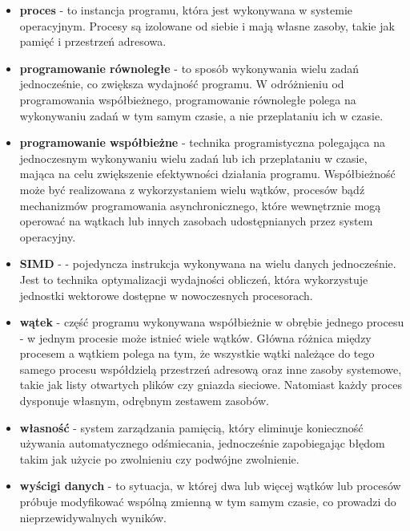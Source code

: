 \begin{itemize}
    \item \textbf{proces} - to instancja programu, która jest wykonywana w systemie operacyjnym. Procesy są izolowane od siebie i mają własne zasoby, takie jak pamięć i przestrzeń adresowa.

    \item \textbf{programowanie równoległe} - to sposób wykonywania wielu zadań jednocześnie, co zwiększa wydajność programu. W odróżnieniu od programowania współbieżnego, programowanie równoległe polega na wykonywaniu zadań w tym samym czasie, a nie przeplataniu ich w czasie.

    \item \textbf{programowanie współbieżne} - technika programistyczna polegająca na jednoczesnym wykonywaniu wielu zadań lub ich przeplataniu w czasie, mająca na celu zwiększenie efektywności działania programu. Współbieżność może być realizowana z wykorzystaniem wielu wątków, procesów bądź mechanizmów programowania asynchronicznego, które wewnętrznie mogą operować na wątkach lub innych zasobach udostępnianych przez system operacyjny.

    \item \textbf{SIMD} -  - pojedyncza instrukcja wykonywana na wielu danych jednocześnie. Jest to technika optymalizacji wydajności obliczeń, która wykorzystuje jednostki wektorowe dostępne w nowoczesnych procesorach.

    \item \textbf{wątek} - część programu wykonywana współbieżnie w obrębie jednego procesu - w jednym procesie może istnieć wiele wątków. Główna różnica między procesem a wątkiem polega na tym, że wszystkie wątki należące do tego samego procesu współdzielą przestrzeń adresową oraz inne zasoby systemowe, takie jak listy otwartych plików czy gniazda sieciowe. Natomiast każdy proces dysponuje własnym, odrębnym zestawem zasobów.

    \item \textbf{własność}  - system zarządzania pamięcią, który eliminuje konieczność używania automatycznego odśmiecania, jednocześnie zapobiegając błędom takim jak użycie po zwolnieniu czy podwójne zwolnienie.

    \item \textbf{wyścigi danych}  - to sytuacja, w której dwa lub więcej wątków lub procesów próbuje modyfikować wspólną zmienną w tym samym czasie, co prowadzi do nieprzewidywalnych wyników.
\end{itemize}

